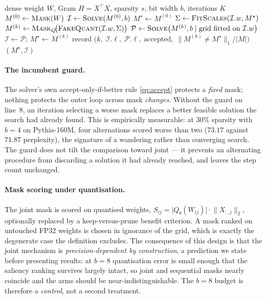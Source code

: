 \begin{algorithm}[t]
\caption{Alternating layerwise co-optimisation (joint arm), per layer}
\label{alg:joint}
\begin{algorithmic}[1]
  \Require dense weight $W$, Gram $H = X^\top X$, sparsity $s$, bit width $b$, iterations $K$
  \State $M^{(0)} \gets \textsc{Mask}(W)$
  \State $\mathcal{I} \gets \textsc{Solve}(M^{(0)}, b)$
  \State $M^{\star} \gets M^{(0)}$
    \State $\Sigma \gets \textsc{FitScales}(\mathcal{I}.w, M^{\star})$
    \State $M^{(k)} \gets \textsc{Mask}_{Q}\!\bigl(\textsc{FakeQuant}(\mathcal{I}.w, \Sigma)\bigr)$
    \State $\mathcal{P} \gets \textsc{Solve}\bigl(M^{(k)}, b \mid \text{grid fitted on } \mathcal{I}.w\bigr)$
      \State $\mathcal{I} \gets \mathcal{P}$; \quad $M^{\star} \gets M^{(k)}$
    \EndIf
    \State record $\bigl(k,\; \mathcal{I}.\ell,\; \mathcal{P}.\ell,\; \text{accepted},\;
           \lVert M^{(k)} \neq M^{\star} \rVert_1 / \lvert M \rvert\bigr)$
  \EndFor
  \State \Return $(M^{\star}, \mathcal{I})$
\end{algorithmic}
\end{algorithm}

\paragraph{The incumbent guard.} The solver's own accept-only-if-better rule
\eqref{eq:accept} protects a \emph{fixed} mask; nothing protects the outer loop across mask
\emph{changes}. Without the guard on line~8, an iteration selecting a worse mask replaces a
better feasible solution the search had already found. This is empirically measurable: at
$30\%$ sparsity with $b{=}4$ on Pythia-160M, four alternations scored worse than two
($73.17$ against $71.87$ perplexity), the signature of a wandering rather than converging
search. The guard does not tilt the comparison toward joint --- it prevents an alternating
procedure from discarding a solution it had already reached, and leaves the step count
unchanged.

\paragraph{Mask scoring under quantisation.} The joint mask is scored on quantised weights,
$S_{ij} = \lvert Q_b(W_{ij}) \rvert \cdot \lVert X_{:,j} \rVert_2$, optionally replaced by a
keep-versus-prune benefit criterion. A mask ranked on untouched FP32 weights is chosen in
ignorance of the grid, which is exactly the degenerate case the definition excludes. The
consequence of this design is that the joint mechanism is \emph{precision-dependent by
construction}, a prediction we state before presenting results: at $b{=}8$ quantisation error
is small enough that the saliency ranking survives largely intact, so joint and sequential
masks nearly coincide and the arms should be near-indistinguishable. The $b{=}8$ budget is
therefore a \emph{control}, not a second treatment.

